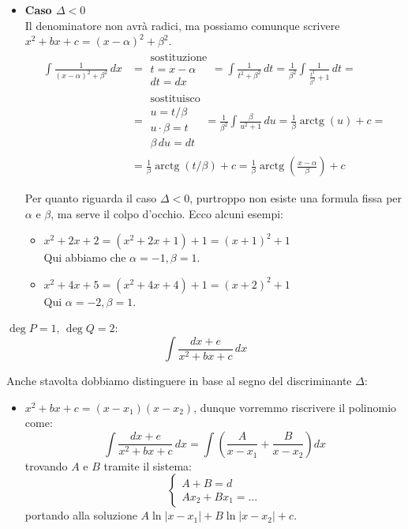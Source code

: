 \documentclass[12pt]{report}
\begin{document}
\begin{description}
\begin{itemize}
			\item \textbf{Caso $\Delta < 0$}\\
			Il denominatore non avrà radici, ma possiamo comunque scrivere $x^2 + bx + c = (x - \alpha)^2 + \beta^2$.
			\[
			\begin{aligned}
				\int \frac{1}{(x - \alpha)^2 + \beta^2} \, dx &= \substack{\text{sostituzione} \\ t = x - \alpha \\ dt = dx} = \int \frac{1}{t^2 + \beta^2} \, dt = \frac{1}{\beta^2} \int \frac{1}{\frac{t^2}{\beta^2} + 1} \, dt = \\
				&= \substack{\text{sostituisco} \\ u = t/\beta \\ u \cdot \beta = t \\ \beta \, du = dt} = \frac{1}{\beta^2} \int \frac{\beta}{u^2 + 1} \, du = \frac{1}{\beta} \operatorname{arctg}(u) + c = \\
				&= \frac{1}{\beta} \operatorname{arctg}(t/\beta) + c = \frac{1}{\beta} \operatorname{arctg}\left(\frac{x - \alpha}{\beta}\right) + c
			\end{aligned}
			\]
			
			Per quanto riguarda il caso $\Delta < 0$, purtroppo non esiste una formula fissa per $\alpha$ e $\beta$, ma serve il colpo d'occhio. Ecco alcuni esempi:
			
			\begin{itemize}
				
				\item $x^2 + 2x + 2 = (x^2 + 2x + 1) + 1 = (x + 1)^2 + 1$\\
				Qui abbiamo che $\alpha = -1, \beta = 1$.
				
				\item $x^2 + 4x + 5 = (x^2 + 4x + 4) + 1 = (x + 2)^2 + 1$\\
				Qui $\alpha = -2, \beta = 1$.
				
			\end{itemize}
			
		\end{itemize}
		
		\item $\deg P = 1,\, \deg Q = 2$:
		\[
		\int \frac{dx + e}{x^2 + bx + c} \, dx
		\]
		
		Anche stavolta dobbiamo distinguere in base al segno del discriminante $\Delta$:
		
		\begin{itemize}
			
			\item [Caso $\Delta > 0$:] $x^2 + bx + c = (x - x_1)(x - x_2)$, dunque vorremmo riscrivere il polinomio come:
			\[
			\int \frac{dx + e}{x^2 + bx + c} \, dx = \int \left( \frac{A}{x - x_1} + \frac{B}{x - x_2} \right) dx
			\]
			trovando $A$ e $B$ tramite il sistema:
			\[
			\begin{cases}
				A + B = d \\
				A x_2 + B x_1 = \dots
			\end{cases}
			\]
			portando alla soluzione $A \ln|x - x_1| + B \ln|x - x_2| + c$.
			

\end{itemize}
\end{description}
\end{document}
